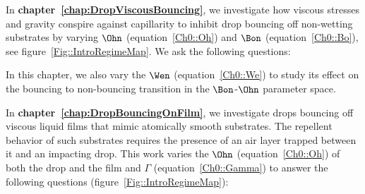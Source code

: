 \vspace{1.25mm}

In \textbf{chapter~\ref{chap:DropViscousBouncing}}, we investigate how viscous stresses and gravity conspire against capillarity to inhibit drop bouncing off non-wetting substrates by varying $\Ohn$ (equation~\eqref{Ch0::Oh}) and  $\Bon$ (equation~\eqref{Ch0::Bo}), see figure~\ref{Fig::IntroRegimeMap}. We ask the following questions:\vspace{1.25mm}

\vspace{1.25mm}

\noindent In this chapter, we also vary the $\Wen$ (equation~\eqref{Ch0::We}) to study its effect on the bouncing to non-bouncing transition in the $\Bon$-$\Ohn$ parameter space.

In \textbf{chapter~\ref{chap:DropBouncingOnFilm}}, we investigate drops bouncing off viscous liquid films that mimic atomically smooth substrates. The repellent behavior of such substrates requires the presence of an air layer trapped between it and an impacting drop. This work varies the $\Ohn$ (equation~\eqref{Ch0::Oh}) of both the drop and the film and $\Gamma$ (equation~\eqref{Ch0::Gamma}) to answer the following questions (figure~\ref{Fig::IntroRegimeMap}):\vspace{1.25mm}

\vspace{1.25mm}

